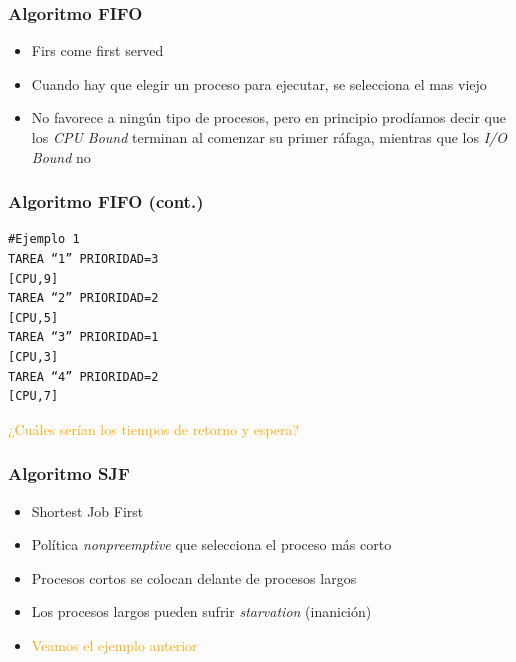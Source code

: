 \begin{frame}
  \frametitle{Algoritmo \textbf{FIFO}}
  \begin{itemize}
		\item Firs come first served
		\item Cuando hay que elegir un proceso para ejecutar, se selecciona el mas viejo
		\item No favorece a ningún tipo de procesos, pero en principio prodíamos decir que los \textit{CPU Bound} terminan al comenzar su primer ráfaga, mientras que los \textit{I/O Bound} no
  \end{itemize}
\end{frame}

\begin{frame}[fragile]
  \frametitle{Algoritmo \textbf{FIFO} (cont.)}
  \begin{table}
      \centering
  \end{table}  
  \begin{lstlisting}
#Ejemplo 1
TAREA “1” PRIORIDAD=3
[CPU,9]
TAREA “2” PRIORIDAD=2
[CPU,5]
TAREA “3” PRIORIDAD=1
[CPU,3]
TAREA “4” PRIORIDAD=2
[CPU,7]  
  \end{lstlisting}  
  \hspace{35pt} \textcolor{orange}{¿Cuáles serían los tiempos de retorno y espera?}
\end{frame}

\begin{frame}
  \frametitle{Algoritmo \textbf{SJF}}
  \begin{itemize}
  		\item Shortest Job First
		\item Política \textit{nonpreemptive} que selecciona el proceso más corto
		\item Procesos cortos se colocan delante de procesos largos
		\item Los procesos largos pueden sufrir \textit{starvation} (inanición)
  		\pause
  		\item \textcolor{orange}{Veamos el ejemplo anterior}	
  \end{itemize}
\end{frame}

